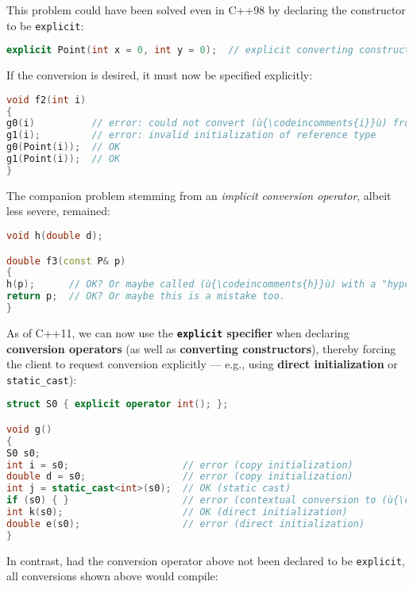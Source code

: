 \noindent This problem could have been solved even in C++98 by declaring the
constructor to be \texttt{explicit}:

\begin{lstlisting}[language=C++]
explicit Point(int x = 0, int y = 0);  // explicit converting constructor
\end{lstlisting}

\noindent If the conversion is desired, it must now be specified explicitly:

\begin{lstlisting}[language=C++]
void f2(int i)
{
g0(i)          // error: could not convert (ù{\codeincomments{i}}ù) from (ù{\codeincomments{int}}ù) to (ù{\codeincomments{Point}}ù)
g1(i);         // error: invalid initialization of reference type
g0(Point(i));  // OK
g1(Point(i));  // OK
}
\end{lstlisting}

\noindent The companion problem stemming from an \emph{implicit conversion
operator}, albeit less severe, remained:

\begin{lstlisting}[language=C++]
void h(double d);

double f3(const P& p)
{
h(p);      // OK? Or maybe called (ù{\codeincomments{h}}ù) with a "hypotenuse" by mistake
return p;  // OK? Or maybe this is a mistake too.
}
\end{lstlisting}

\noindent As of C++11, we can now use the \textbf{\texttt{explicit} specifier}
when declaring \textbf{conversion operators} (as well as
\textbf{converting constructors}), thereby forcing the client to request
conversion explicitly --- e.g., using \textbf{direct initialization} or
\texttt{static\_cast}):

\begin{lstlisting}[language=C++]
struct S0 { explicit operator int(); };

void g()
{
S0 s0;
int i = s0;                    // error (copy initialization)
double d = s0;                 // error (copy initialization)
int j = static_cast<int>(s0);  // OK (static cast)
if (s0) { }                    // error (contextual conversion to (ù{\codeincomments{bool}}ù))
int k(s0);                     // OK (direct initialization)
double e(s0);                  // error (direct initialization)
}
\end{lstlisting}

\noindent In contrast, had the conversion operator above not been declared to be
\texttt{explicit}, all conversions shown above would compile:

